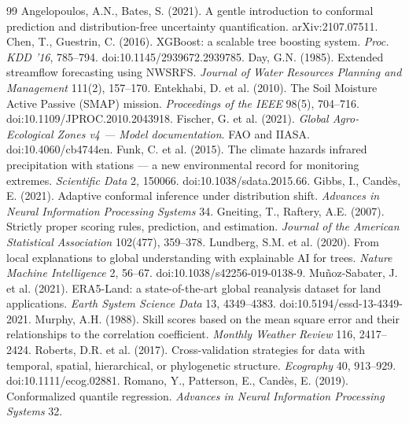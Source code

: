 \documentclass[11pt,a4paper]{article}
\begin{document}
\begin{thebibliography}{99}\small
{} Angelopoulos, A.N., Bates, S. (2021). A gentle introduction to conformal prediction and distribution-free uncertainty quantification. arXiv:2107.07511.
 Chen, T., Guestrin, C. (2016). XGBoost: a scalable tree boosting system. \emph{Proc. KDD '16}, 785--794. doi:10.1145/2939672.2939785.
 Day, G.N. (1985). Extended streamflow forecasting using NWSRFS. \emph{Journal of Water Resources Planning and Management} 111(2), 157--170.
 Entekhabi, D. et al. (2010). The Soil Moisture Active Passive (SMAP) mission. \emph{Proceedings of the IEEE} 98(5), 704--716. doi:10.1109/JPROC.2010.2043918.
 Fischer, G. et al. (2021). \emph{Global Agro-Ecological Zones v4 --- Model documentation}. FAO and IIASA. doi:10.4060/cb4744en.
 Funk, C. et al. (2015). The climate hazards infrared precipitation with stations --- a new environmental record for monitoring extremes. \emph{Scientific Data} 2, 150066. doi:10.1038/sdata.2015.66.
 Gibbs, I., Cand\`es, E. (2021). Adaptive conformal inference under distribution shift. \emph{Advances in Neural Information Processing Systems} 34.
 Gneiting, T., Raftery, A.E. (2007). Strictly proper scoring rules, prediction, and estimation. \emph{Journal of the American Statistical Association} 102(477), 359--378.
 Lundberg, S.M. et al. (2020). From local explanations to global understanding with explainable AI for trees. \emph{Nature Machine Intelligence} 2, 56--67. doi:10.1038/s42256-019-0138-9.
 Mu\~noz-Sabater, J. et al. (2021). ERA5-Land: a state-of-the-art global reanalysis dataset for land applications. \emph{Earth System Science Data} 13, 4349--4383. doi:10.5194/essd-13-4349-2021.
 Murphy, A.H. (1988). Skill scores based on the mean square error and their relationships to the correlation coefficient. \emph{Monthly Weather Review} 116, 2417--2424.
 Roberts, D.R. et al. (2017). Cross-validation strategies for data with temporal, spatial, hierarchical, or phylogenetic structure. \emph{Ecography} 40, 913--929. doi:10.1111/ecog.02881.
 Romano, Y., Patterson, E., Cand\`es, E. (2019). Conformalized quantile regression. \emph{Advances in Neural Information Processing Systems} 32.
\end{thebibliography}
\end{document}
